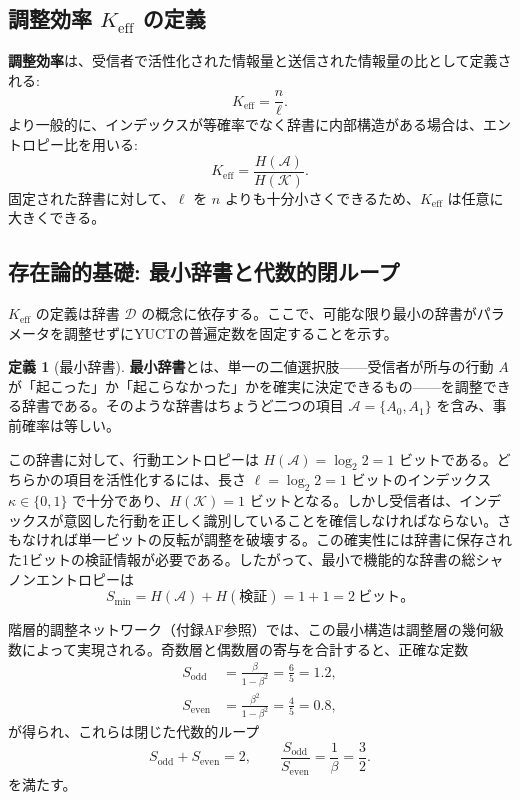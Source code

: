 \documentclass[12pt,a4paper]{article}
\theoremstyle{definition}
\newtheorem{definition}[theorem]{定義}
\theoremstyle{remark}
\newcommand{\Keff}{K_{\mathrm{eff}}}
\begin{document}
	\subsection{調整効率 $\Keff$ の定義}
	\label{sec:keff-def}
	
	\textbf{調整効率}は、受信者で活性化された情報量と送信された情報量の比として定義される:
	\begin{equation}
		\Keff = \frac{n}{\ell}. \label{eq:keff-def}
	\end{equation}
	より一般的に、インデックスが等確率でなく辞書に内部構造がある場合は、エントロピー比を用いる:
	\begin{equation}
		\Keff = \frac{H(\mathcal{A})}{H(\mathcal{K})}.
	\end{equation}
	固定された辞書に対して、$\ell$ を $n$ よりも十分小さくできるため、$\Keff$ は任意に大きくできる。
	
	\subsection{存在論的基礎: 最小辞書と代数的閉ループ}
	\label{subsec:minimal-dict}
	
	$\Keff$ の定義は辞書 $\mathcal{D}$ の概念に依存する。ここで、可能な限り最小の辞書がパラメータを調整せずにYUCTの普遍定数を固定することを示す。
	
	\begin{definition}[最小辞書]
		\textbf{最小辞書}とは、単一の二値選択肢——受信者が所与の行動 $A$ が「起こった」か「起こらなかった」かを確実に決定できるもの——を調整できる辞書である。そのような辞書はちょうど二つの項目 $\mathcal{A} = \{A_0, A_1\}$ を含み、事前確率は等しい。
	\end{definition}
	
	この辞書に対して、行動エントロピーは $H(\mathcal{A}) = \log_2 2 = 1$ ビットである。どちらかの項目を活性化するには、長さ $\ell = \log_2 2 = 1$ ビットのインデックス $\kappa \in \{0,1\}$ で十分であり、$H(\mathcal{K}) = 1$ ビットとなる。しかし受信者は、インデックスが意図した行動を正しく識別していることを確信しなければならない。さもなければ単一ビットの反転が調整を破壊する。この確実性には辞書に保存された1ビットの検証情報が必要である。したがって、最小で機能的な辞書の総シャノンエントロピーは
	\begin{equation}
		S_{\min} = H(\mathcal{A}) + H(\text{検証}) = 1 + 1 = 2\ \text{ビット}。
		\label{eq:smin}
	\end{equation}
	
	階層的調整ネットワーク（付録AF参照）では、この最小構造は調整層の幾何級数によって実現される。奇数層と偶数層の寄与を合計すると、正確な定数
	\begin{align}
		S_{\mathrm{odd}} &= \frac{\beta}{1-\beta^{2}} = \frac{6}{5} = 1.2, \label{eq:sodd-appx}\\
		S_{\mathrm{even}} &= \frac{\beta^{2}}{1-\beta^{2}} = \frac{4}{5} = 0.8, \label{eq:seven-appx}
	\end{align}
	が得られ、これらは閉じた代数的ループ
	\begin{equation}
		S_{\mathrm{odd}} + S_{\mathrm{even}} = 2, \qquad
		\frac{S_{\mathrm{odd}}}{S_{\mathrm{even}}} = \frac{1}{\beta} = \frac{3}{2}.
		\label{eq:algebraic-loop-appx}
	\end{equation}
	を満たす。
	
\end{document}
